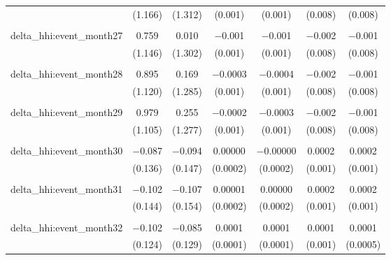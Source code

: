 \begin{table}[H]
{\begin{tabular}{@{\extracolsep{5pt}}lcccccc}
   & (1.166) & (1.312) & (0.001) & (0.001) & (0.008) & (0.008) \\  

   & & & & & & \\  

  delta\_hhi:event\_month27 & 0.759 & 0.010 & $-$0.001 & $-$0.001 & $-$0.002 & $-$0.001 \\  

   & (1.146) & (1.302) & (0.001) & (0.001) & (0.008) & (0.008) \\  

   & & & & & & \\  

  delta\_hhi:event\_month28 & 0.895 & 0.169 & $-$0.0003 & $-$0.0004 & $-$0.002 & $-$0.001 \\  

   & (1.120) & (1.285) & (0.001) & (0.001) & (0.008) & (0.008) \\  

   & & & & & & \\  

  delta\_hhi:event\_month29 & 0.979 & 0.255 & $-$0.0002 & $-$0.0003 & $-$0.002 & $-$0.001 \\  

   & (1.105) & (1.277) & (0.001) & (0.001) & (0.008) & (0.008) \\  

   & & & & & & \\  

  delta\_hhi:event\_month30 & $-$0.087 & $-$0.094 & 0.00000 & $-$0.00000 & 0.0002 & 0.0002 \\  

   & (0.136) & (0.147) & (0.0002) & (0.0002) & (0.001) & (0.001) \\  

   & & & & & & \\  

  delta\_hhi:event\_month31 & $-$0.102 & $-$0.107 & 0.00001 & 0.00000 & 0.0002 & 0.0002 \\  

   & (0.144) & (0.154) & (0.0002) & (0.0002) & (0.001) & (0.001) \\  

   & & & & & & \\  

  delta\_hhi:event\_month32 & $-$0.102 & $-$0.085 & 0.0001 & 0.0001 & 0.0001 & 0.0001 \\  

   & (0.124) & (0.129) & (0.0001) & (0.0001) & (0.001) & (0.0005) \\  


\end{tabular}}
\end{table}
